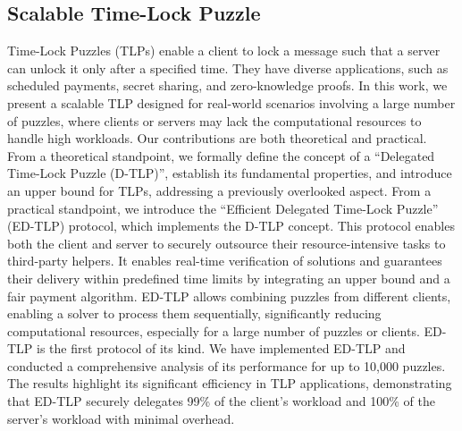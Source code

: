 \documentclass[11pt]{article}
\theoremstyle{definition}
\theoremstyle{remark}
\theoremstyle{plain}
\begin{document}
\subsection{\cite{10.1145/3708821.3733907} Scalable Time-Lock Puzzle}
Time-Lock Puzzles (TLPs) enable a client to lock a message such that a server can unlock it only after a specified time. They have diverse applications, such as scheduled payments, secret sharing, and zero-knowledge proofs. In this work, we present a scalable TLP designed for real-world scenarios involving a large number of puzzles, where clients or servers may lack the computational resources to handle high workloads. Our contributions are both theoretical and practical. From a theoretical standpoint, we formally define the concept of a “Delegated Time-Lock Puzzle (D-TLP)”, establish its fundamental properties, and introduce an upper bound for TLPs, addressing a previously overlooked aspect. From a practical standpoint, we introduce the “Efficient Delegated Time-Lock Puzzle” (ED-TLP) protocol, which implements the D-TLP concept. This protocol enables both the client and server to securely outsource their resource-intensive tasks to third-party helpers. It enables real-time verification of solutions and guarantees their delivery within predefined time limits by integrating an upper bound and a fair payment algorithm. ED-TLP allows combining puzzles from different clients, enabling a solver to process them sequentially, significantly reducing computational resources, especially for a large number of puzzles or clients. ED-TLP is the first protocol of its kind. We have implemented ED-TLP and conducted a comprehensive analysis of its performance for up to 10,000 puzzles. The results highlight its significant efficiency in TLP applications, demonstrating that ED-TLP securely delegates 99\% of the client’s workload and 100\% of the server’s workload with minimal overhead.
\end{document}
